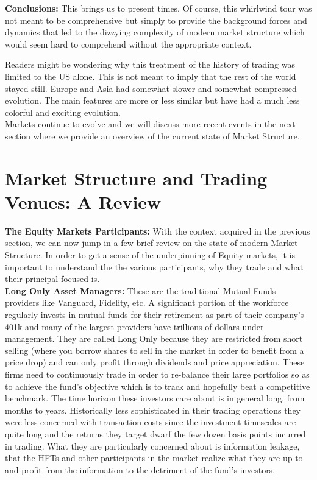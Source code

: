 \noindent\textbf{Conclusions:} This brings us to present times. Of course, this whirlwind tour was not meant to be comprehensive but simply to provide the background forces and dynamics that led to the dizzying complexity of modern market structure which would seem hard to comprehend without the appropriate context. 


Readers might be wondering why this treatment of the history of trading was limited to the US alone. This is not meant to imply that the rest of the world stayed still. Europe and Asia had somewhat slower and somewhat compressed evolution. The main features are more or less similar but have had a much less colorful and exciting evolution. \\


Markets continue to evolve and we will discuss more recent events in the next section where we provide an overview of the current state of Market Structure.



\section{Market Structure and Trading Venues: A Review}


\noindent\textbf{The Equity Markets Participants:} With the context acquired in the previous section, we can now jump in a few brief review on the state of modern Market Structure. In order to get a sense of the underpinning of Equity markets, it is important to understand the the various participants, why they trade and what their principal focused is. \\


\noindent\textbf{Long Only Asset Managers:} These are the traditional Mutual Funds providers like Vanguard, Fidelity, etc. A significant portion of the workforce regularly invests in mutual funds for their retirement as part of their company's 401k and many of the largest providers have trillions of dollars under management. They are called Long Only because they are restricted from short selling (where you borrow shares to sell in the market in order to benefit from a price drop) and can only profit through dividends and price appreciation. These firms need to continuously trade in order to re-balance their large portfolios so as to achieve the fund's objective which is to track and hopefully beat a competitive benchmark. The time horizon these investors care about is in general long, from months to years. Historically less sophisticated in their trading operations they were less concerned with transaction costs since the investment timescales are quite long and the returns they target dwarf the few dozen basis points incurred in trading. What they are particularly concerned about is information leakage, that the HFTs and other participants in the market realize what they are up to and profit from the information to the detriment of the fund's investors. \\


